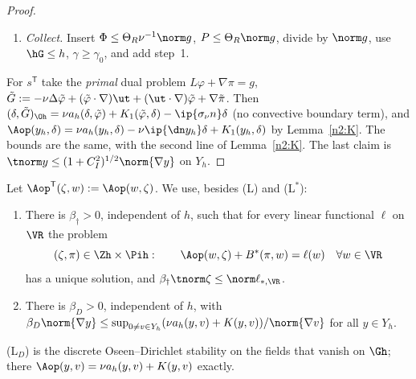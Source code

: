 \begin{proof}
\begin{enumerate}
$\nu|a_h(\delta,\tilde\varphi-y_h)|+|K_1(\delta,\tilde\varphi-y_h)|\le C(\nu+U_\infty)h\Phi\tnorm\delta$ (Lemma~\ref{n2:K}; both fields vanish on $\partial R$);
$|\ip{\sigma_\nu n}\delta|\le C(\nu\Phi+P)(h/\mu)^{1/2}\tnorm\delta$ (uniform trace from the collar);
$|\ip{(\ut\cdot n)\delta}{\tilde\varphi}|\le CU_\infty\hG^2(h/\mu)^{1/2}\Phi\tnorm\delta$;
$|(\delta,\tilde G)_{S_h}|\le C_{\rm str}\hG\norm{\tilde G}\tnorm\delta$.
\item \emph{Collect.} Insert $\Phi\le\Theta_R\nu^{-1}\norm g$, $P\le\Theta_R\norm g$, divide by $\norm g$, use $\hG\le h$, $\gamma\ge\gamma_0$, and add step~1.
\end{enumerate}
For $s^{\mathsf T}$ take the \emph{primal} dual problem $L\varphi+\nabla\pi=g$, $\tilde G:=-\nu\Delta\tilde\varphi+(\tilde\varphi\cdot\nabla)\ut+(\ut\cdot\nabla)\tilde\varphi+\nabla\tilde\pi$.
Then $(\delta,\tilde G)_{\Oh}=\nu a_h(\delta,\tilde\varphi)+K_1(\tilde\varphi,\delta)-\ip{\sigma_\nu n}\delta$ (no convective boundary term), and
$\Aop(y_h,\delta)=\nu a_h(y_h,\delta)-\nu\ip{\dn y_h}\delta+K_1(y_h,\delta)$ by Lemma~\ref{n2:K}. The bounds are the same, with the second
line of Lemma~\ref{n2:K}. The last claim is $\tnorm y\le(1+C_I^2)^{1/2}\norm{\nabla y}$ on $Y_h$.
\end{proof}

\begin{definition}\label{n2:LD}
Let $\Aop^{\mathsf T}(\zeta,w):=\Aop(w,\zeta)$. We use, besides (L) and (L$^\ast$):
\begin{enumerate}
\item[(L$^\dagger$)] There is $\beta_\dagger>0$, independent of $h$, such that for every linear functional $\ell$ on $\VR$ the problem
\[
(\zeta,\pi)\in\Zh\times\Pih:\qquad\Aop(w,\zeta)+B^\ast(\pi,w)=\ell(w)\quad\forall w\in\VR
\]
has a unique solution, and $\beta_\dagger\tnorm\zeta\le\norm\ell_{\ast,\VR}$.
\item[(L$_D$)] There is $\beta_D>0$, independent of $h$, with $\beta_D\norm{\nabla y}\le\sup_{0\ne v\in Y_h}(\nu a_h(y,v)+K(y,v))/\norm{\nabla v}$ for all $y\in Y_h$.
\end{enumerate}
\end{definition}

(L$_D$) is the discrete Oseen--Dirichlet stability on the fields that vanish on $\Gh$; there $\Aop(y,v)=\nu a_h(y,v)+K(y,v)$ exactly.

